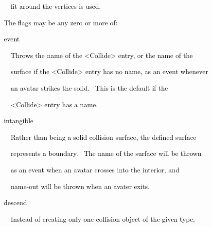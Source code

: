\documentclass[a4paper]{article}
\newcommand\textstyleOOoComputerKeyWord[1]{\textrm{\textcolor[rgb]{0.0,0.0,0.5019608}{#1}}}
\begin{document}
{\color{black}
\textstyleOOoComputerKeyWord{\textcolor{black}{\ \ \ \ \ \ fit around the vertices is used.}}}


\bigskip


\bigskip

{\color{black}
\textstyleOOoComputerKeyWord{\textcolor{black}{\ \ \ \ The flags may be any zero or more of:}}}


\bigskip

{\color{black}
\textstyleOOoComputerKeyWord{\textcolor{black}{\ \ \ \ event}}}


\bigskip

{\color{black}
\textstyleOOoComputerKeyWord{\textcolor{black}{\ \ \ \ \ \ Throws the name of the {\textless}Collide{\textgreater}
entry, or the name of the}}}

{\color{black}
\textstyleOOoComputerKeyWord{\textcolor{black}{\ \ \ \ \ \ surface if the {\textless}Collide{\textgreater} entry has no
name, as an event whenever}}}

{\color{black}
\textstyleOOoComputerKeyWord{\textcolor{black}{\ \ \ \ \ \ an avatar strikes the solid. \ This is the default if the}}}

{\color{black}
\textstyleOOoComputerKeyWord{\textcolor{black}{\ \ \ \ \ \ {\textless}Collide{\textgreater} entry has a name.}}}


\bigskip

{\color{black}
\textstyleOOoComputerKeyWord{\textcolor{black}{\ \ \ \ intangible}}}


\bigskip

{\color{black}
\textstyleOOoComputerKeyWord{\textcolor{black}{\ \ \ \ \ \ Rather than being a solid collision surface, the defined
surface}}}

{\color{black}
\textstyleOOoComputerKeyWord{\textcolor{black}{\ \ \ \ \ \ represents a boundary. \ The name of the surface will be
thrown}}}

{\color{black}
\textstyleOOoComputerKeyWord{\textcolor{black}{\ \ \ \ \ \ as an event when an avatar crosses into the interior, and}}}

{\color{black}
\textstyleOOoComputerKeyWord{\textcolor{black}{\ \ \ \ \ \ name-out will be thrown when an avater exits.}}}


\bigskip

{\color{black}
\textstyleOOoComputerKeyWord{\textcolor{black}{\ \ \ \ descend}}}


\bigskip

{\color{black}
\textstyleOOoComputerKeyWord{\textcolor{black}{\ \ \ \ \ \ Instead of creating only one collision object of the given
type,}}}
\end{document}
